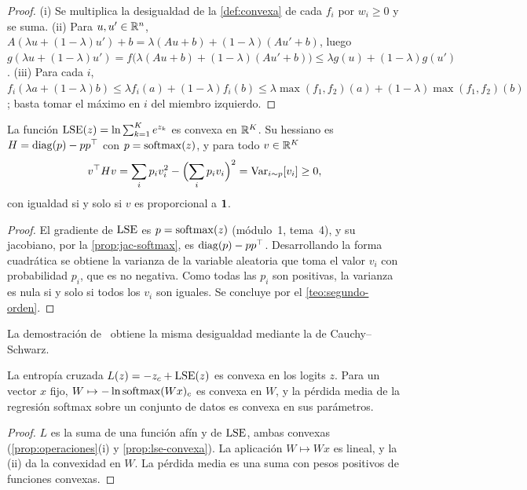 \begin{proof}
(i) Se multiplica la desigualdad de la \cref{def:convexa} de cada $f_i$ por $w_i\ge 0$ y se suma. (ii) Para $u,u'\in\mathbb{R}^{n}$, $A(\lambda u+(1-\lambda)u')+b=\lambda(Au+b)+(1-\lambda)(Au'+b)$, luego $g(\lambda u+(1-\lambda)u')=f\bigl(\lambda(Au+b)+(1-\lambda)(Au'+b)\bigr)\le\lambda g(u)+(1-\lambda)g(u')$. (iii) Para cada $i$, $f_i(\lambda a+(1-\lambda)b)\le\lambda f_i(a)+(1-\lambda)f_i(b)\le\lambda\max(f_1,f_2)(a)+(1-\lambda)\max(f_1,f_2)(b)$; basta tomar el máximo en $i$ del miembro izquierdo.
\end{proof}

\begin{proposicion}\label{prop:lse-convexa}
La función $\operatorname{LSE}(z)=\ln\sum_{k=1}^{K}e^{z_k}$ es convexa en $\mathbb{R}^{K}$. Su hessiano es $H=\operatorname{diag}(p)-pp^{\top}$ con $p=\operatorname{softmax}(z)$, y para todo $v\in\mathbb{R}^{K}$
\[
v^{\top} Hv=\sum_i p_iv_i^{2}-\Bigl(\sum_i p_iv_i\Bigr)^{2}=\operatorname{Var}_{i\sim p}[v_i]\ge 0,
\]
con igualdad si y solo si $v$ es proporcional a $\mathbf{1}$.
\end{proposicion}

\begin{proof}
El gradiente de $\operatorname{LSE}$ es $p=\operatorname{softmax}(z)$ (módulo~1, tema~4), y su jacobiano, por la \cref{prop:jac-softmax}, es $\operatorname{diag}(p)-pp^{\top}$. Desarrollando la forma cuadrática se obtiene la varianza de la variable aleatoria que toma el valor $v_i$ con probabilidad $p_i$, que es no negativa. Como todas las $p_i$ son positivas, la varianza es nula si y solo si todos los $v_i$ son iguales. Se concluye por el \cref{teo:segundo-orden}.
\end{proof}

La demostración de~\cite[§3.1]{bv} obtiene la misma desigualdad mediante la de Cauchy--Schwarz.

\begin{corolario}\label{cor:ce-convexa}
La entropía cruzada $L(z)=-z_c+\operatorname{LSE}(z)$ es convexa en los logits $z$. Para un vector $x$ fijo, $W\mapsto -\ln\operatorname{softmax}(Wx)_c$ es convexa en $W$, y la pérdida media de la regresión softmax sobre un conjunto de datos es convexa en sus parámetros.
\end{corolario}

\begin{proof}
$L$ es la suma de una función afín y de $\operatorname{LSE}$, ambas convexas (\cref{prop:operaciones}(i) y \cref{prop:lse-convexa}). La aplicación $W\mapsto Wx$ es lineal, y la (ii) da la convexidad en $W$. La pérdida media es una suma con pesos positivos de funciones convexas.
\end{proof}

